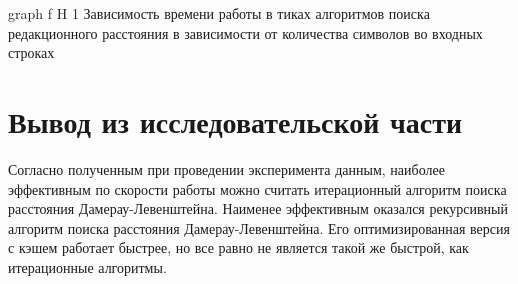     {graph}
    {f}
    {H}
    {1\textwidth}
    {Зависимость времени работы в тиках алгоритмов поиска редакционного расстояния в зависимости от количества символов во входных строках}

\section*{Вывод из исследовательской части}

Согласно полученным при проведении эксперимента данным, наиболее эффективным по скорости работы можно считать итерационный алгоритм поиска расстояния Дамерау-Левенштейна. 
Наименее эффективным оказался рекурсивный алгоритм поиска расстояния Дамерау-Левенштейна. 
Его оптимизированная версия с кэшем работает быстрее, но все равно не является такой же быстрой, как итерационные алгоритмы.
